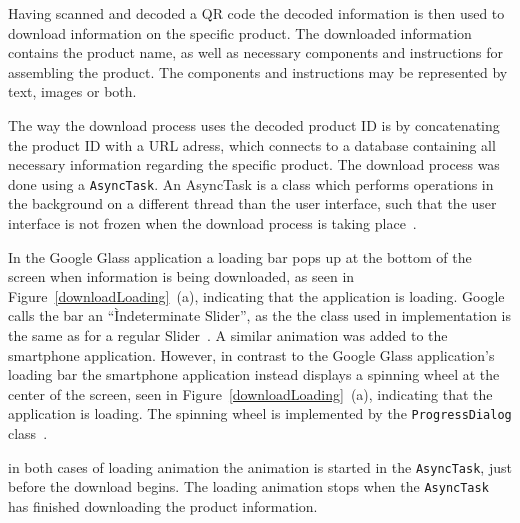 

Having scanned and decoded a QR code the decoded information is then used to download information on the specific product. The downloaded information contains the product name, as well as necessary components and instructions for assembling the product. The components and instructions may be represented by text, images or both. 

The way the download process uses the decoded product ID is by concatenating the product ID with a URL adress, which connects to a database containing all necessary information regarding the specific product. The download process was done using a \texttt{AsyncTask}. An AsyncTask is a class which performs operations in the background on a different thread than the user interface, such that the user interface is not frozen when the download process is taking place~\cite{asyncTask}.

In the Google Glass application a loading bar pops up at the bottom of the screen when information is being downloaded, as seen in Figure~\ref{downloadLoading}~(a), indicating that the application is loading. Google calls the bar an ``Ìndeterminate Slider'', as the the class used in implementation is the same as for a regular Slider~\cite{indeterminateSlide}. A similar animation was added to the smartphone application. However, in contrast to the Google Glass application's loading bar the smartphone application instead displays a spinning wheel at the center of the screen, seen in Figure~\ref{downloadLoading}~(a), indicating that the application is loading. The spinning wheel is implemented by the \texttt{ProgressDialog} class~\cite{loadingWheel}.

in both cases of loading animation the animation is started in the \texttt{AsyncTask}, just before the download begins. The loading animation stops when the \texttt{AsyncTask} has finished downloading the product information.


